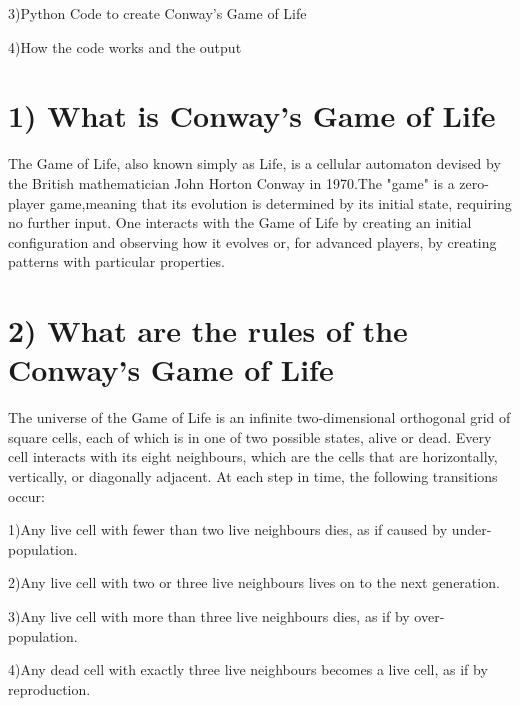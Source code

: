 \documentclass{tufte-handout}
\begin{document}
	3){\color{red}Python Code} to create Conway's Game of Life
	
	4){\color{red}How} the code works and the {\color{red}output}




\vspace{1cm}


\large

\section{1) {\color{red}What is} Conway's Game of Life}

The {\color{blue}Game of Life}, also known simply as Life, is a cellular 
automaton devised by the British mathematician John Horton 
Conway in 1970.The "game" is a zero-player game,meaning
that its evolution is determined by its initial state, 
requiring no further input. One interacts with the Game of 
Life by creating an initial configuration and observing how 
it evolves or, for advanced players, by creating patterns 
with particular properties.


\normalsize

\section{2) What are the {\color{red}rules} of the Conway's Game of Life}



The universe of the Game of Life is an infinite two-dimensional orthogonal grid of square cells, each of which is in one of two possible states, alive or dead. Every cell interacts with its eight neighbours, which are the cells that are horizontally, vertically, or diagonally adjacent. At each step in time, the following transitions occur:

	1)Any live cell with {\color{blue}fewer than two} live neighbours dies, as if caused by under-population.
	
	2)Any live cell with {\color{blue}two or three} live neighbours lives on to the next generation.
	
	3)Any live cell with {\color{blue}more than three} live neighbours dies, as if by over-population.
	
	4)Any dead cell with {\color{blue}exactly three} live neighbours becomes a live cell, as if by reproduction.
\end{document}
